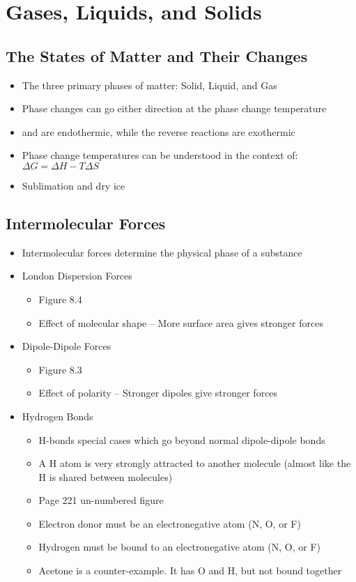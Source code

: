 \documentclass[12pt, openany, letterpaper]{memoir}
\begin{document}
\chapter{Gases, Liquids, and Solids}
\section{The States of Matter and Their Changes}
\begin{itemize}
	\item The three primary phases of matter: Solid, Liquid, and Gas
	\item Phase changes can go either direction at the phase change temperature
	\item {} and  are endothermic, while the reverse reactions are exothermic
	\item Phase change temperatures can be understood in the context of: $\Delta G = \Delta H - T\Delta S$
	\item Sublimation and dry ice
\end{itemize}
\section{Intermolecular Forces}
\begin{itemize}
	\item Intermolecular forces determine the physical phase of a substance
	\item London Dispersion Forces
	\begin{itemize}
		\item Figure 8.4
		\item Effect of molecular shape -- More surface area gives stronger forces
	\end{itemize}
	\item Dipole-Dipole Forces
	\begin{itemize}
		\item Figure 8.3
		\item Effect of polarity -- Stronger dipoles give stronger forces
	\end{itemize}
	\item Hydrogen Bonds
	\begin{itemize}
		\item H-bonds special cases which go beyond normal dipole-dipole bonds
		\item A H atom is very strongly attracted to another molecule (almost like the H is shared between molecules)
		\item Page 221 un-numbered figure
		\item Electron donor must be an electronegative atom (N, O, or F)
		\item Hydrogen must be bound to an electronegative atom (N, O, or F)
		\item Acetone is a counter-example. It has O and H, but not bound together
	\end{itemize}
\end{itemize}
\end{document}

